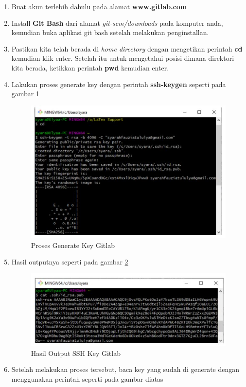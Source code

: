 \begin{enumerate}
\item Buat akun terlebih dahulu pada alamat \textbf{www.gitlab.com}
\item Install \textbf{Git Bash} dari alamat \textit{git-scm/downloads} pada komputer anda, kemudian buka aplikasi git bash setelah melakukan penginstallan.
\item Pastikan kita telah berada di \textit{home directory} dengan mengetikan perintah \textbf{cd} kemudian klik enter. Setelah itu untuk mengetahui posisi dimana direktori kita berada, ketikkan perintah \textbf{pwd} kemudian enter.
\item Lakukan proses generate key dengan perintah \textbf{ssh-keygen} seperti pada gambar \ref{fig:k1}
\subitem 
\begin{figure}[!htbp]
\centerline{\includegraphics[width=.75\textwidth]{Figures/gitlab/SSH.JPG}}
\caption{Proses Generate Key Gitlab}
\label{fig:k1}
\end{figure}
\item Hasil outputnya seperti pada gambar \ref{fig:s1}
\subitem
\begin{figure}[!htbp]
\centerline{\includegraphics[width=.75\textwidth]{Figures/gitlab/SSH2.JPG}}
\caption{Hasil Output SSH Key Gitlab}
\label{fig:s1}
\end{figure}
\item Setelah melakukan proses tersebut, baca key yang sudah di generate dengan menggunakan perintah seperti pada gambar diatas 

\end{enumerate}
